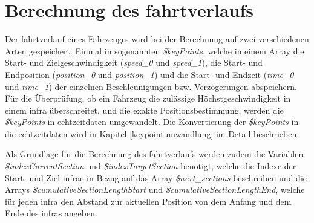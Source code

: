 \section{Berechnung des \Gls{fahrtverlauf}s} \label{kapitelFahrtverlauf}
Der \Gls{fahrtverlauf} eines Fahrzeuges wird bei der Berechnung auf zwei verschiedenen Arten gespeichert. Einmal in sogenannten \textit{\$keyPoints}, welche in einem Array die Start- und Zielgeschwindigkeit (\textit{speed\_0} und \textit{speed\_1}), die Start- und Endposition (\textit{position\_0} und \textit{position\_1}) und die Start- und Endzeit (\textit{time\_0} und \textit{time\_1}) der einzelnen Beschleunigungen bzw. Verzögerungen abspeichern. Für die Überprüfung, ob ein Fahrzeug die zulässige Höchstgeschwindigkeit in einem \ac{infra} überschreitet, und die exakte Positionsbestimmung, werden die \textit{\$keyPoints} in \Gls{echtzeitdaten} umgewandelt. Die Konvertierung der \textit{\$keyPoints} in die \Gls{echtzeitdaten} wird in Kapitel \ref{keypointumwandlung} im Detail beschrieben.

Als Grundlage für die Berechnung des \Gls{fahrtverlauf}s werden zudem die Variablen \textit{\$indexCurrentSection} und \textit{\$indexTargetSection} benötigt, welche die Indexe der Start- und Ziel-\ac{infra}e in Bezug auf das Array \textit{\$next\_sections} beschreiben und die Arrays \textit{\$cumulativeSectionLengthStart} und \textit{\$cumulativeSectionLengthEnd}, welche für jeden \ac{infra} den Abstand zur aktuellen Position von dem Anfang und dem Ende des \ac{infra}s angeben.

